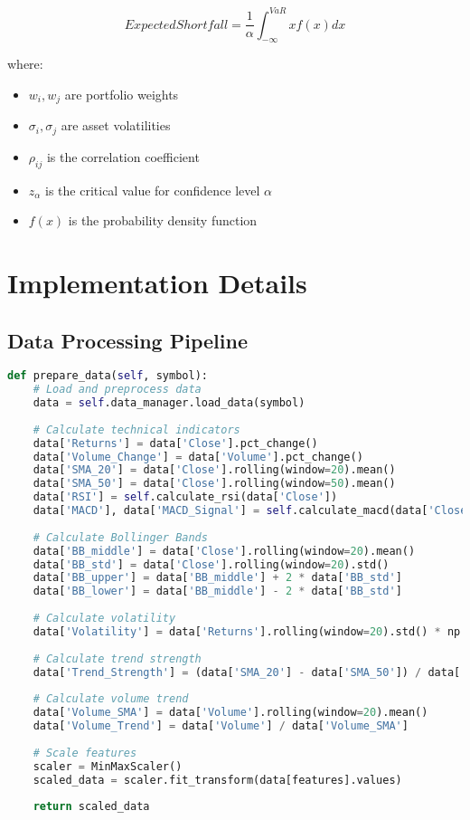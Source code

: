 \documentclass[conference]{IEEEtran}
\begin{document}
\begin{equation}
ExpectedShortfall = \frac{1}{\alpha} \int_{-\infty}^{VaR} x f(x) dx
\end{equation}

where:
\begin{itemize}
    \item $w_i, w_j$ are portfolio weights
    \item $\sigma_i, \sigma_j$ are asset volatilities
    \item $\rho_{ij}$ is the correlation coefficient
    \item $z_\alpha$ is the critical value for confidence level $\alpha$
    \item $f(x)$ is the probability density function
\end{itemize}

\section{Implementation Details}

\subsection{Data Processing Pipeline}
\begin{lstlisting}[language=Python]
def prepare_data(self, symbol):
    # Load and preprocess data
    data = self.data_manager.load_data(symbol)
    
    # Calculate technical indicators
    data['Returns'] = data['Close'].pct_change()
    data['Volume_Change'] = data['Volume'].pct_change()
    data['SMA_20'] = data['Close'].rolling(window=20).mean()
    data['SMA_50'] = data['Close'].rolling(window=50).mean()
    data['RSI'] = self.calculate_rsi(data['Close'])
    data['MACD'], data['MACD_Signal'] = self.calculate_macd(data['Close'])
    
    # Calculate Bollinger Bands
    data['BB_middle'] = data['Close'].rolling(window=20).mean()
    data['BB_std'] = data['Close'].rolling(window=20).std()
    data['BB_upper'] = data['BB_middle'] + 2 * data['BB_std']
    data['BB_lower'] = data['BB_middle'] - 2 * data['BB_std']
    
    # Calculate volatility
    data['Volatility'] = data['Returns'].rolling(window=20).std() * np.sqrt(252)
    
    # Calculate trend strength
    data['Trend_Strength'] = (data['SMA_20'] - data['SMA_50']) / data['SMA_50']
    
    # Calculate volume trend
    data['Volume_SMA'] = data['Volume'].rolling(window=20).mean()
    data['Volume_Trend'] = data['Volume'] / data['Volume_SMA']
    
    # Scale features
    scaler = MinMaxScaler()
    scaled_data = scaler.fit_transform(data[features].values)
    
    return scaled_data
\end{lstlisting}
\end{document}
